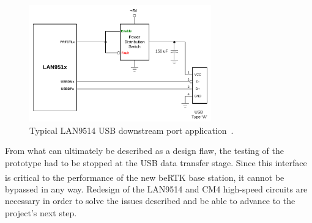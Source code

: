 \begin{figure}[h]
	\centering
	\includegraphics[width=0.7\textwidth]{Chapters/Figures/chapter5/prototype/VBUS_Schematic_Chklst.pdf}
	\caption{Typical LAN9514 USB downstream port application~\cite{LAN9514_Schematic_Checklist}.}
	\label{fig:VBUS_Schematic_Chklst}
\end{figure}%

From what can ultimately be described as a design flaw, the testing of the prototype had to be stopped at the USB data transfer stage. Since this interface is critical to the performance of the new beRTK\textsuperscript{\textregistered} base station, it cannot be bypassed in any way. Redesign of the LAN9514 and CM4 high-speed circuits are necessary in order to solve the issues described and be able to advance to the project's next step.








